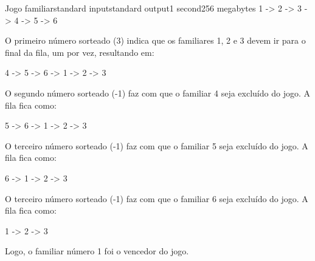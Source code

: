 \begin{problem}{Jogo familiar}{standard input}{standard output}{1 second}{256 megabytes}
1 -> 2 -> 3 -> 4 -> 5 -> 6

O primeiro número sorteado (3) indica que os familiares 1, 2 e 3 devem ir para o final da fila, um por vez, resultando em:

4 -> 5 -> 6 -> 1 -> 2 -> 3 

O segundo número sorteado (-1) faz com que o familiar 4 seja excluído do jogo. A fila fica como:

5 -> 6 -> 1 -> 2 -> 3 

O terceiro número sorteado (-1) faz com que o familiar 5 seja excluído do jogo. A fila fica como:

6 -> 1 -> 2 -> 3

O terceiro número sorteado (-1) faz com que o familiar 6 seja excluído do jogo. A fila fica como:

1 -> 2 -> 3

Logo, o familiar número 1 foi o vencedor do jogo.

\end{problem}

